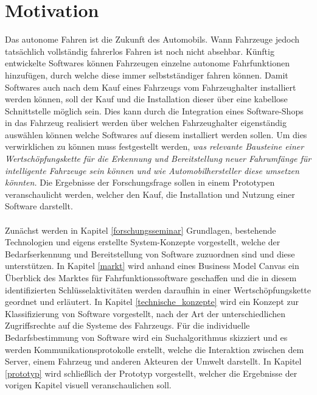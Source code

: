 \setcounter{page}{1}
\section{Motivation}
Das autonome Fahren ist die Zukunft des Automobils. Wann Fahrzeuge jedoch tatsächlich vollständig fahrerlos Fahren ist noch nicht absehbar. Künftig entwickelte Softwares können Fahrzeugen einzelne autonome Fahrfunktionen hinzufügen, durch welche diese immer selbstständiger fahren können. Damit Softwares auch nach dem Kauf eines Fahrzeugs vom Fahrzeughalter installiert werden können, soll der Kauf und die Installation dieser über eine kabellose Schnittstelle möglich sein. Dies kann durch die Integration eines Software-Shops in das Fahrzeug realisiert werden über welchen Fahrzeughalter eigenständig auswählen können welche Softwares auf diesem installiert werden sollen. Um dies verwirklichen zu können muss festgestellt werden, \textit{was relevante Bausteine einer Wertschöpfungskette für die Erkennung und Bereitstellung neuer Fahrumfänge für intelligente Fahrzeuge sein können und wie Automobilhersteller diese umsetzen könnten.} Die Ergebnisse der Forschungsfrage sollen in einem Prototypen veranschaulicht werden, welcher den Kauf, die Installation und Nutzung einer Software darstellt.\\\\ 
Zunächst werden in Kapitel \ref{forschungsseminar} Grundlagen, bestehende Technologien und eigens erstellte System-Konzepte vorgestellt, welche der Bedarfserkennung und Bereitstellung von Software zuzuordnen sind und diese unterstützen. In Kapitel \ref{markt} wird anhand eines Business Model Canvas ein Überblick des Marktes für Fahrfunktionssoftware geschaffen und die in diesem identifizierten Schlüsselaktivitäten werden daraufhin in einer Wertschöpfungskette geordnet und erläutert. In Kapitel \ref{technische_konzepte} wird ein Konzept zur Klassifizierung von Software vorgestellt, nach der Art der unterschiedlichen Zugriffsrechte auf die Systeme des Fahrzeugs. Für die individuelle Bedarfsbestimmung von Software wird ein Suchalgorithmus skizziert und es werden Kommunikationsprotokolle erstellt, welche die Interaktion zwischen dem Server, einem Fahrzeug und anderen Akteuren der Umwelt darstellt. In Kapitel \ref{prototyp} wird schließlich der Prototyp vorgestellt, welcher die Ergebnisse der vorigen Kapitel visuell veranschaulichen soll.\\